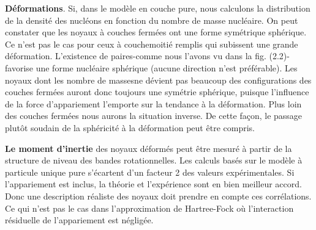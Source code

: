 \textbf{Déformations}. Si, dans le modèle en couche pure, nous calculons la distribution de la densité des nucléons en
fonction du nombre de masse nucléaire. On peut constater que les noyaux à couches fermées ont une forme symétrique
sphérique. Ce n'est pas le cas pour ceux à couchemoitié remplis qui subissent une grande déformation.
L'existence de paires-comme nous l'avons vu dans la fig. (2.2)- favorise une forme nucléaire sphérique (aucune direction
n'est préférable). Les noyaux dont les nombre de massesne dévient pas beaucoup des configurations des couches
fermées auront donc toujours une symétrie sphérique, puisque l'influence de la force d'appariement l'emporte sur la
tendance à la déformation. Plus loin des couches fermées nous aurons la situation inverse. De cette façon, le passage
plutôt soudain de la sphéricité à la déformation peut être compris.

\textbf{Le moment d'inertie} des noyaux déformés peut être mesuré à partir de la structure de niveau des bandes
rotationnelles. Les calculs basés sur le modèle à particule unique pure s'écartent d'un facteur 2 des valeurs
expérimentales. Si l'appariement est inclus, la théorie et l'expérience sont en bien meilleur accord. Donc une
description réaliste des noyaux doit prendre en compte ces corrélations. Ce qui n'est pas le cas dans l'approximation
de Hartree-Fock où l'interaction résiduelle de l'appariement est négligée.

